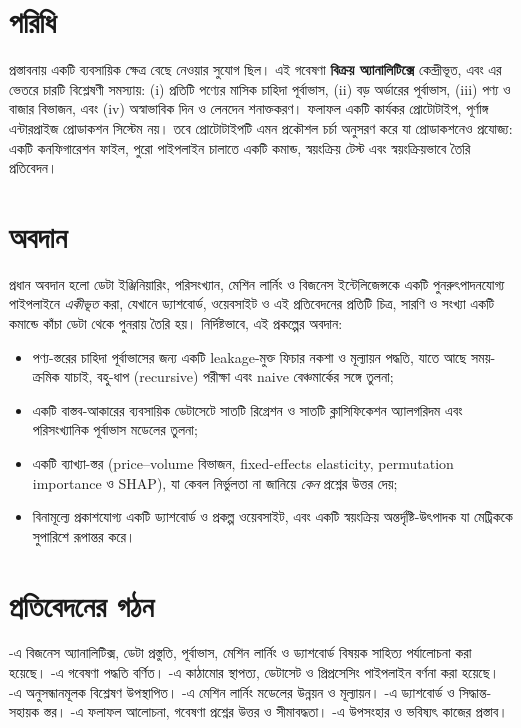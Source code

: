 \section{পরিধি}
প্রস্তাবনায় একটি ব্যবসায়িক ক্ষেত্র বেছে নেওয়ার সুযোগ ছিল। এই গবেষণা \textbf{বিক্রয় অ্যানালিটিক্সে} কেন্দ্রীভূত, এবং এর ভেতরে চারটি
বিশ্লেষণী সমস্যায়: (i) প্রতিটি পণ্যের মাসিক চাহিদা পূর্বাভাস, (ii) বড় অর্ডারের পূর্বাভাস, (iii) পণ্য ও বাজার বিভাজন, এবং
(iv) অস্বাভাবিক দিন ও লেনদেন শনাক্তকরণ। ফলাফল একটি কার্যকর প্রোটোটাইপ, পূর্ণাঙ্গ এন্টারপ্রাইজ প্রোডাকশন সিস্টেম নয়। তবে
প্রোটোটাইপটি এমন প্রকৌশল চর্চা অনুসরণ করে যা প্রোডাকশনেও প্রযোজ্য: একটি কনফিগারেশন ফাইল, পুরো পাইপলাইন চালাতে একটি
কমান্ড, স্বয়ংক্রিয় টেস্ট এবং স্বয়ংক্রিয়ভাবে তৈরি প্রতিবেদন।

\section{অবদান}
প্রধান অবদান হলো ডেটা ইঞ্জিনিয়ারিং, পরিসংখ্যান, মেশিন লার্নিং ও বিজনেস ইন্টেলিজেন্সকে একটি পুনরুৎপাদনযোগ্য পাইপলাইনে
\emph{একীভূত} করা, যেখানে ড্যাশবোর্ড, ওয়েবসাইট ও এই প্রতিবেদনের প্রতিটি চিত্র, সারণি ও সংখ্যা একটি কমান্ডে কাঁচা ডেটা থেকে
পুনরায় তৈরি হয়। নির্দিষ্টভাবে, এই প্রকল্পের অবদান:
\begin{itemize}
  \item পণ্য-স্তরের চাহিদা পূর্বাভাসের জন্য একটি leakage-মুক্ত ফিচার নকশা ও মূল্যায়ন পদ্ধতি, যাতে আছে সময়-ক্রমিক যাচাই,
        বহু-ধাপ (recursive) পরীক্ষা এবং naive বেঞ্চমার্কের সঙ্গে তুলনা;
  \item একটি বাস্তব-আকারের ব্যবসায়িক ডেটাসেটে সাতটি রিগ্রেশন ও সাতটি ক্লাসিফিকেশন অ্যালগরিদম এবং পরিসংখ্যানিক পূর্বাভাস
        মডেলের তুলনা;
  \item একটি ব্যাখ্যা-স্তর (price--volume বিভাজন, fixed-effects elasticity, permutation importance ও SHAP), যা কেবল
        নির্ভুলতা না জানিয়ে \emph{কেন} প্রশ্নের উত্তর দেয়;
  \item বিনামূল্যে প্রকাশযোগ্য একটি ড্যাশবোর্ড ও প্রকল্প ওয়েবসাইট, এবং একটি স্বয়ংক্রিয় অন্তর্দৃষ্টি-উৎপাদক যা মেট্রিককে সুপারিশে রূপান্তর করে।
\end{itemize}

\section{প্রতিবেদনের গঠন}
-এ বিজনেস অ্যানালিটিক্স, ডেটা প্রস্তুতি, পূর্বাভাস, মেশিন লার্নিং ও ড্যাশবোর্ড বিষয়ক সাহিত্য পর্যালোচনা করা
হয়েছে। -এ গবেষণা পদ্ধতি বর্ণিত। -এ কাঠামোর স্থাপত্য, ডেটাসেট ও প্রিপ্রসেসিং পাইপলাইন
বর্ণনা করা হয়েছে। -এ অনুসন্ধানমূলক বিশ্লেষণ উপস্থাপিত। -এ মেশিন লার্নিং মডেলের উন্নয়ন ও
মূল্যায়ন। -এ ড্যাশবোর্ড ও সিদ্ধান্ত-সহায়ক স্তর। -এ ফলাফল আলোচনা, গবেষণা প্রশ্নের
উত্তর ও সীমাবদ্ধতা। -এ উপসংহার ও ভবিষ্যৎ কাজের প্রস্তাব।
